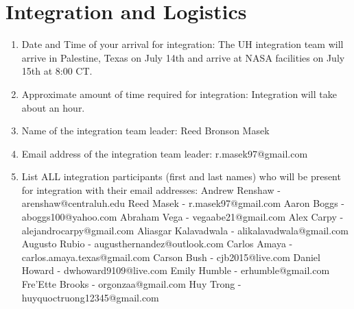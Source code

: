 \newpage
\section{Integration and Logistics}
\label{sec:Logistics}

\hspace*{0.5cm}
\begin{minipage}{\linewidth-0.5cm}
  \begin{enumerate}[label = \Alph*.]
  \item Date and Time of your arrival for integration: \newline
    The UH integration team will arrive in Palestine, Texas on July 14th and arrive at NASA facilities on July 15th at 8:00 CT.
  \item Approximate amount of time required for integration: \newline
    Integration will take about an hour.
  \item Name of the integration team leader: \newline
    Reed Bronson Masek    
  \item Email address of the integration team leader: \newline
    r.masek97@gmail.com
  \item List ALL integration participants (first and last names) who will be present for integration with their email addresses: \newline
    Andrew Renshaw - arenshaw@centraluh.edu \newline
    Reed Masek - r.masek97@gmail.com \newline
    Aaron Boggs - aboggs100@yahoo.com \newline
    Abraham Vega - vegaabe21@gmail.com \newline
    Alex Carpy - alejandrocarpy@gmail.com \newline
    Aliasgar Kalavadwala - alikalavadwala@gmail.com \newline
    Augusto Rubio - augusthernandez@outlook.com \newline
    Carlos Amaya - carlos.amaya.texas@gmail.com \newline
    Carson Bush - cjb2015@live.com \newline
    Daniel Howard - dwhoward9109@live.com \newline
    Emily Humble - erhumble@gmail.com \newline
    Fre'Ette Brooks - orgonzaa@gmail.com \newline
    Huy Trong - huyquoctruong12345@gmail.com \newline

\end{enumerate}
\end{minipage}

